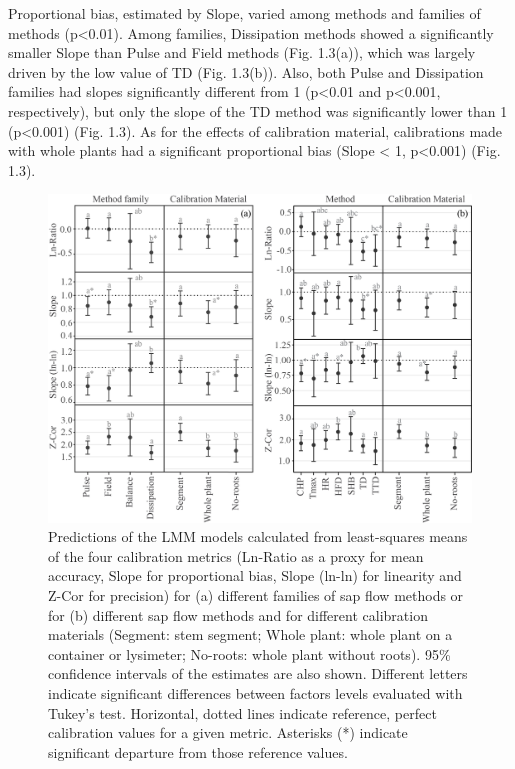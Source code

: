 \documentclass[11pt,twoside]{reedthesis}
\begin{document}
Proportional bias, estimated by Slope, varied among methods and families
of methods (p\textless{}0.01). Among families, Dissipation methods
showed a significantly smaller Slope than Pulse and Field methods (Fig.
1.3(a)), which was largely driven by the low value of TD (Fig. 1.3(b)).
Also, both Pulse and Dissipation families had slopes significantly
different from 1 (p\textless{}0.01 and p\textless{}0.001, respectively),
but only the slope of the TD method was significantly lower than 1
(p\textless{}0.001) (Fig. 1.3). As for the effects of calibration
material, calibrations made with whole plants had a significant
proportional bias (Slope \textless{} 1, p\textless{}0.001) (Fig. 1.3).
\begin{figure}[p]

{\centering \includegraphics[width=1\linewidth]{figure/CH2/FAMILYMETHODS} 

}

\caption[Predictions of the LMM models of the four calibration metrics.]{Predictions of the LMM models calculated from least-squares means of the four calibration metrics (Ln-Ratio as a proxy for mean accuracy, Slope for proportional bias, Slope (ln-ln) for linearity and Z-Cor for precision) for (a) different families of sap flow methods or for (b) different sap flow methods and for different calibration materials (Segment: stem segment; Whole plant: whole plant on a container or lysimeter; No-roots: whole plant without roots). 95\% confidence intervals of the estimates are also shown. Different letters indicate significant differences between factors levels evaluated with Tukey's test. Horizontal, dotted lines indicate reference, perfect calibration values for a given metric. Asterisks (*) indicate significant departure from those reference values.}\label{fig:ch2fig3}
\end{figure}
\end{document}
